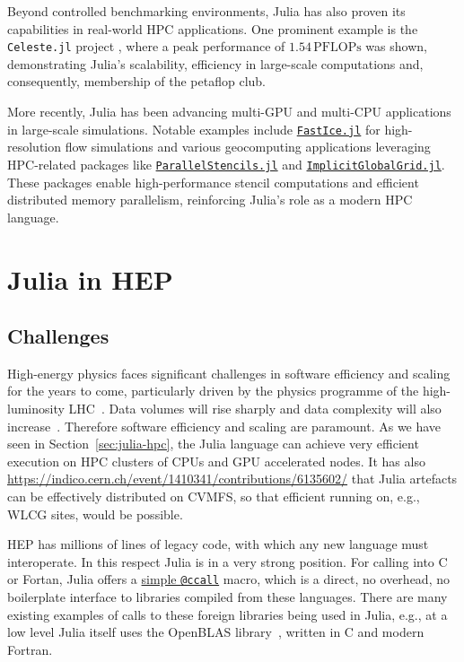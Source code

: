 \documentclass{webofc}
\begin{document}
Beyond controlled benchmarking environments, Julia has also proven its
capabilities in real-world HPC applications. One prominent example is the
\texttt{Celeste.jl} project \cite{RiegerIEEE:2018,RiegerAAS:2019}, where a peak
performance of \(1.54\,\mathrm{PFLOPs}\) was shown, demonstrating Julia's
scalability, efficiency in large-scale computations and, consequently,
membership of the petaflop club.

More recently, Julia has been advancing multi-GPU and multi-CPU applications in
large-scale simulations. Notable examples include
\href{https://github.com/PTsolvers/FastIce.jl}{\texttt{FastIce.jl}} for
high-resolution flow simulations and various geocomputing applications
leveraging HPC-related packages like
\href{https://github.com/omlins/ParallelStencil.jl}{\texttt{ParallelStencils.jl}}
and
\href{https://github.com/eth-cscs/ImplicitGlobalGrid.jl}{\texttt{ImplicitGlobalGrid.jl}}.
These packages enable high-performance stencil computations and efficient
distributed memory parallelism, reinforcing Julia’s role as a modern HPC
language.

\section{Julia in HEP}

\subsection{Challenges}

High-energy physics faces significant challenges in software efficiency and
scaling for the years to come, particularly driven by the physics programme of
the high-luminosity LHC~\cite{hsfcwp}. Data volumes will rise sharply and data
complexity will also
increase~\cite{CERN-LHCC-2022-005,Software:2815292,Valassi2021}. Therefore
software efficiency and scaling are paramount. As we have seen in
Section~\ref{sec:julia-hpc}, the Julia language can achieve very efficient
execution on HPC clusters of CPUs and GPU accelerated nodes. It has also
\href{been shown}{https://indico.cern.ch/event/1410341/contributions/6135602/}
that Julia artefacts can be effectively distributed on CVMFS, so that efficient
running on, e.g., WLCG sites, would be possible.

HEP has millions of lines of legacy code, with which any new language must
interoperate. In this respect Julia is in a very strong position. For calling
into C or Fortan, Julia offers a
\href{https://docs.julialang.org/en/v1/manual/calling-c-and-fortran-code/}{simple
\texttt{@ccall}} macro, which is a direct, no overhead, no boilerplate interface
to libraries compiled from these languages. There are many existing examples of
calls to these foreign libraries being used in Julia, e.g., at a low level Julia
itself uses the OpenBLAS library~\cite{6877458}, written in C and modern
Fortran. 
\end{document}
